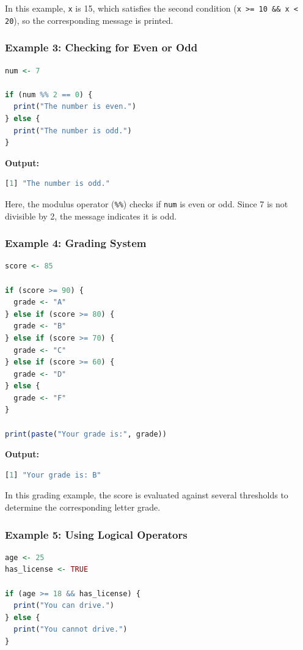 \documentclass[10pt]{book}
\begin{document}
In this example, \texttt{x} is 15, which satisfies the second condition (\texttt{x >= 10 \&\& x < 20}), so the corresponding message is printed.

\subsubsection{Example 3: Checking for Even or Odd}

\begin{lstlisting}[language=R]
num <- 7

if (num %% 2 == 0) {
  print("The number is even.")
} else {
  print("The number is odd.")
}
\end{lstlisting}

\textbf{Output:}
\begin{lstlisting}[language=R]
[1] "The number is odd."
\end{lstlisting}

Here, the modulus operator (\texttt{\%\%}) checks if \texttt{num} is even or odd. Since 7 is not divisible by 2, the message indicates it is odd.

\subsubsection{Example 4: Grading System}

\begin{lstlisting}[language=R]
score <- 85

if (score >= 90) {
  grade <- "A"
} else if (score >= 80) {
  grade <- "B"
} else if (score >= 70) {
  grade <- "C"
} else if (score >= 60) {
  grade <- "D"
} else {
  grade <- "F"
}

print(paste("Your grade is:", grade))
\end{lstlisting}

\textbf{Output:}
\begin{lstlisting}[language=R]
[1] "Your grade is: B"
\end{lstlisting}

In this grading example, the score is evaluated against several thresholds to determine the corresponding letter grade.

\subsubsection{Example 5: Using Logical Operators}

\begin{lstlisting}[language=R]
age <- 25
has_license <- TRUE

if (age >= 18 && has_license) {
  print("You can drive.")
} else {
  print("You cannot drive.")
}
\end{lstlisting}
\end{document}
